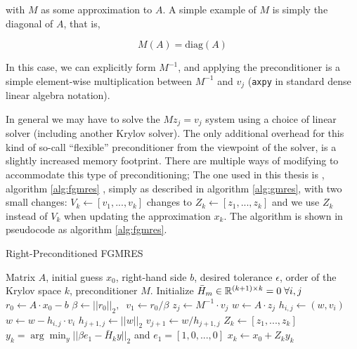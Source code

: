 \noindent
with $M$ as some approximation to $A$. A simple example of $M$ is simply the diagonal of $A$, that is,

\begin{equation}
	M(A) = \text{diag}(A)
\end{equation}

%

In this case, we can explicitly form $M^{-1}$, and applying the preconditioner is a simple element-wise multiplication between $M^{-1}$ and $v_j$ (\lstinline|axpy| in standard dense linear algebra notation). 

In general we may have to solve the $Mz_j = v_j$ system using a choice of linear solver (including another Krylov solver). The only additional overhead for this kind of so-call ``flexible'' preconditioner \cite{saad1993} from the viewpoint of the {\gmres} solver,  is a slightly increased memory footprint. There are multiple ways of modifying {\gmres} to accommodate this type of preconditioning; The one used in this thesis is {\fgmres}, algorithm \ref{alg:fgmres} \cite{saad1993}, simply {\gmres} as described in algorithm \ref{alg:gmres}, with two small changes: $V_{k} \gets [v_{1},...,v_{k}]$ changes to $Z_{k} \gets [z_{1},...,z_{k}]$ and we use $Z_{k}$ instead of $V_{k}$ when updating the approximation $x_{k}$. The {\fgmres} algorithm is shown in pseudocode as algorithm \ref{alg:fgmres}.

\begin{algorithm}
	\caption{Right-Preconditioned FGMRES \cite{saad1993}}
	\label{alg:fgmres}
	\begin{algorithmic}
		\Require Matrix $A$, initial guess $x_{0}$, right-hand side $b$, desired tolerance $\epsilon$, order of the Krylov space $k$, preconditioner $M$.
		\State Initialize $\bar{H}_{m} \in \mathbb{R}^{(k+1)\times k} = 0\;\forall i,j$
		\State $r_{0} \gets A\cdot x_{0}-b$
		\State $\beta \gets ||r_{0}||_{2},\;\; v_{1} \gets r_{0}/\beta$
			\State $z_{j} \gets M^{-1}\cdot v_{j}$
			\State $w \gets A\cdot z_{j}$
				\State $h_{i,j} \gets (w, v_{i})$
				\State $w \gets w - h_{i,j}\cdot v_{i}$
			\EndFor
			\State $h_{j+1,j} \gets ||w||_{2}$
			\State $v_{j+1} \gets w / h_{j+1,j}$
		\EndFor
		\State $Z_{k} \gets \left [z_{1}, ..., z_{k} \right]$
		\State $y_{k} = \arg\min_{y}||\beta e_{1} - \bar{H}_{k}y||_{2}$ and $e_{1} = [1,0,...,0]$
		\State $x_{k} \gets x_{0} + Z_{k}y_{k}$ 
	\end{algorithmic}
\end{algorithm}

